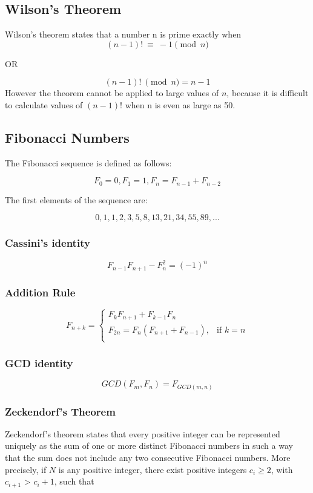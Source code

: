 \documentclass[twoside,12pt,a4paper,english]{book}
\theoremstyle{definition}
\theoremstyle{problemstyle}
\theoremstyle{problemstyle}
\theoremstyle{problemstyle}
\begin{document}
\subsection{Wilson’s Theorem}
Wilson’s theorem states that a number n is prime exactly when
$$(n-1)!\ \equiv\ -1 \pmod n$$
\begin{center}
    OR
\end{center}
$$(n-1)!\ \pmod{n} = n - 1$$
However the theorem cannot be applied to large values of $n$, because
it is difficult to calculate values of $(n-1)!$ when n is even as large as 50.

\subsection{Fibonacci Numbers}
The Fibonacci sequence is defined as follows:

$$F_0 = 0, F_1 = 1, F_n = F_{n-1} + F_{n-2}$$

The first elements of the sequence are:

$$0, 1, 1, 2, 3, 5, 8, 13, 21, 34, 55, 89, ...$$

\subsubsection{Cassini's identity}

$$F_{n-1} F_{n+1} - F_n^2 = (-1)^n$$

\subsubsection{Addition Rule}



\[
    F_{n+k}= 
\begin{cases}
   F_k F_{n+1} + F_{k-1} F_n\\
   F_{2n} = F_n (F_{n+1} + F_{n-1}),& \text{if } k = n\\
\end{cases}
\]

\subsubsection{GCD identity}

$$GCD(F_m, F_n) = F_{GCD(m, n)}$$

\subsubsection{Zeckendorf's Theorem}
Zeckendorf's theorem states that every positive integer can be represented uniquely as the sum of one or more distinct Fibonacci numbers in such a way that the sum does not include any two consecutive Fibonacci numbers. More precisely, if $N$ is any positive integer, there exist positive integers $c_i \geq 2$, with $c_{i+1}$ > $c_i + 1$, such that
\end{document}
